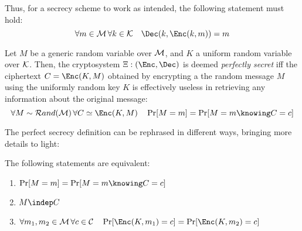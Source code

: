 Thus, for a secrecy scheme to work as intended, the following statement must hold:
\[
    \forall m \in \M \, \forall k \in \K \quad \Dec(k, \Enc(k, m)) = m
\]

\begin{definition}
    Let $M$ be a generic random variable over $\mathcal{M}$, and $K$ a uniform random variable over $\mathcal{K}$. Then, the cryptosystem $\Xi: (\Enc, \Dec)$ is deemed \emph{perfectly secret} iff the ciphertext $C = \Enc(K, M)$ obtained by encrypting a the random message $M$ using the uniformly random key $K$ is effectively useless in retrieving any information about the original message:
    \[
        \forall M \sim \mathcal{R}and(\M) \, \forall C \simeq \Enc(K, M) \quad \Pr[M = m] = \Pr[M = m \knowing C = c]
    \]
\end{definition}

The perfect secrecy definition can be rephrased in different ways, bringing more details to light:
    
\begin{proposition}
    The following statements are equivalent:
    \begin{enumerate}
        \item \label{def:ps1} $\Pr[M = m] = \Pr[M = m \knowing C = c]$
        \item \label{def:ps2} $M \indep C$
        \item \label{def:ps3} $\forall m_1, m_2 \in \M \, \forall c \in \C \quad \Pr[\Enc(K, m_1) = c] = \Pr[\Enc(K, m_2) = c]$
    \end{enumerate}
\end{proposition}

